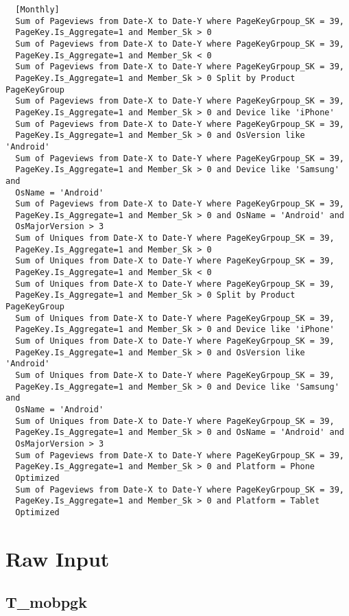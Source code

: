 \begin{verbatim}
  [Monthly]
  Sum of Pageviews from Date-X to Date-Y where PageKeyGrpoup_SK = 39,
  PageKey.Is_Aggregate=1 and Member_Sk > 0
  Sum of Pageviews from Date-X to Date-Y where PageKeyGrpoup_SK = 39,
  PageKey.Is_Aggregate=1 and Member_Sk < 0
  Sum of Pageviews from Date-X to Date-Y where PageKeyGrpoup_SK = 39,
  PageKey.Is_Aggregate=1 and Member_Sk > 0 Split by Product PageKeyGroup
  Sum of Pageviews from Date-X to Date-Y where PageKeyGrpoup_SK = 39,
  PageKey.Is_Aggregate=1 and Member_Sk > 0 and Device like 'iPhone'
  Sum of Pageviews from Date-X to Date-Y where PageKeyGrpoup_SK = 39,
  PageKey.Is_Aggregate=1 and Member_Sk > 0 and OsVersion like 'Android'
  Sum of Pageviews from Date-X to Date-Y where PageKeyGrpoup_SK = 39,
  PageKey.Is_Aggregate=1 and Member_Sk > 0 and Device like 'Samsung' and
  OsName = 'Android'
  Sum of Pageviews from Date-X to Date-Y where PageKeyGrpoup_SK = 39,
  PageKey.Is_Aggregate=1 and Member_Sk > 0 and OsName = 'Android' and
  OsMajorVersion > 3
  Sum of Uniques from Date-X to Date-Y where PageKeyGrpoup_SK = 39,
  PageKey.Is_Aggregate=1 and Member_Sk > 0
  Sum of Uniques from Date-X to Date-Y where PageKeyGrpoup_SK = 39,
  PageKey.Is_Aggregate=1 and Member_Sk < 0
  Sum of Uniques from Date-X to Date-Y where PageKeyGrpoup_SK = 39,
  PageKey.Is_Aggregate=1 and Member_Sk > 0 Split by Product PageKeyGroup
  Sum of Uniques from Date-X to Date-Y where PageKeyGrpoup_SK = 39,
  PageKey.Is_Aggregate=1 and Member_Sk > 0 and Device like 'iPhone'
  Sum of Uniques from Date-X to Date-Y where PageKeyGrpoup_SK = 39,
  PageKey.Is_Aggregate=1 and Member_Sk > 0 and OsVersion like 'Android'
  Sum of Uniques from Date-X to Date-Y where PageKeyGrpoup_SK = 39,
  PageKey.Is_Aggregate=1 and Member_Sk > 0 and Device like 'Samsung' and
  OsName = 'Android'
  Sum of Uniques from Date-X to Date-Y where PageKeyGrpoup_SK = 39,
  PageKey.Is_Aggregate=1 and Member_Sk > 0 and OsName = 'Android' and
  OsMajorVersion > 3
  Sum of Pageviews from Date-X to Date-Y where PageKeyGrpoup_SK = 39,
  PageKey.Is_Aggregate=1 and Member_Sk > 0 and Platform = Phone
  Optimized
  Sum of Pageviews from Date-X to Date-Y where PageKeyGrpoup_SK = 39,
  PageKey.Is_Aggregate=1 and Member_Sk > 0 and Platform = Tablet
  Optimized

\end{verbatim}

\section{Raw Input}

\subsection{T\_mobpgk}
\label{T_mobpgk}

